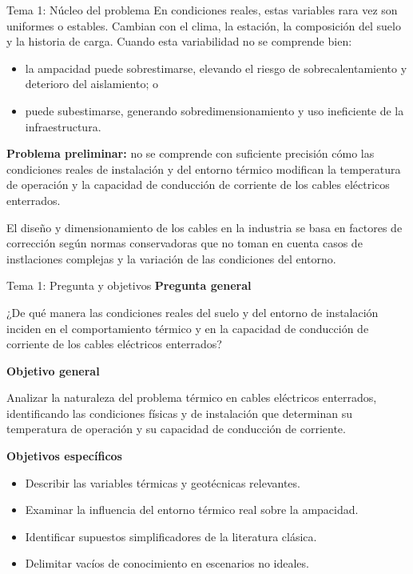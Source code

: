 \documentclass[aspectratio=169]{beamer}
\begin{document}
\begin{frame}{Tema 1: Núcleo del problema}
\justifying
En condiciones reales, estas variables rara vez son uniformes o estables. Cambian con el clima, la estación, la composición del suelo y la historia de carga. Cuando esta variabilidad no se comprende bien:
\begin{itemize}[leftmargin=*]
    \item la ampacidad puede sobrestimarse, elevando el riesgo de sobrecalentamiento y deterioro del aislamiento; o
    \item puede subestimarse, generando sobredimensionamiento y uso ineficiente de la infraestructura.
\end{itemize}

\vspace{0.5em}
\textbf{Problema preliminar:} no se comprende con suficiente precisión cómo las condiciones reales de instalación y del entorno térmico modifican la temperatura de operación y la capacidad de conducción de corriente de los cables eléctricos enterrados.

El diseño y dimensionamiento de los cables en la industria se basa en factores de corrección según normas conservadoras que no toman en cuenta casos de instlaciones complejas y la variación de las condiciones del entorno.
\end{frame}

\begin{frame}{Tema 1: Pregunta y objetivos}
\textbf{Pregunta general}

¿De qué manera las condiciones reales del suelo y del entorno de instalación inciden en el comportamiento térmico y en la capacidad de conducción de corriente de los cables eléctricos enterrados?

\vspace{0.7em}
\textbf{Objetivo general}

Analizar la naturaleza del problema térmico en cables eléctricos enterrados, identificando las condiciones físicas y de instalación que determinan su temperatura de operación y su capacidad de conducción de corriente.

\vspace{0.7em}
\textbf{Objetivos específicos}
\begin{itemize}[leftmargin=*]
    \item Describir las variables térmicas y geotécnicas relevantes.
    \item Examinar la influencia del entorno térmico real sobre la ampacidad.
    \item Identificar supuestos simplificadores de la literatura clásica.
    \item Delimitar vacíos de conocimiento en escenarios no ideales.
\end{itemize}
\end{frame}
\end{document}
